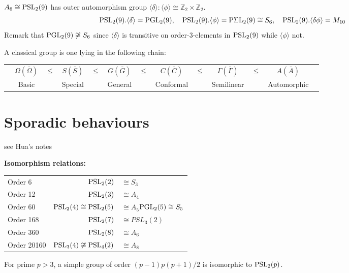 \documentclass[a4paper,11pt]{article}
\def\subtitle#1{\section{#1}}
\begin{document}
\begin{example}
    $A_6\cong \mathrm{PSL}_2(9)$ has outer automorphism group $\langle\delta\rangle:\langle\phi\rangle\cong\mathbb{Z}_2\times\mathbb{Z}_2$.
    \[ \mathrm{PSL}_2(9).\langle\delta\rangle=\mathrm{PGL}_2(9),\quad \mathrm{PSL}_2(9).\langle\phi\rangle=\mathrm{P\Sigma L}_2(9)\cong S_6,\quad \mathrm{PSL}_2(9).\langle\delta\phi\rangle=M_{10} \]
    Remark that $\mathrm{PGL}_2(9)\not\cong S_6$ since $\langle\delta\rangle$ is transitive on order-3-elements in $\mathrm{PSL}_2(9)$ while $\langle\phi\rangle$ not.
\end{example}

\begin{definition} A classical group is one lying in the following chain:
    \begin{table*}[htbp]
        \centering
        \begin{tabular}{ccccccccccccc}
            &$\Omega (\bar{\Omega}) $&$\leq$&$ S (\bar{S}) $&$\leq $&$G (\bar{G})$&$\leq $&$C (\bar{C})$&$\leq $&$\Gamma (\bar{\Gamma})$&$\leq $&$A (\bar{A})$\\
            &Basic & & Special & & General & & Conformal & & Semilinear & & Automorphic 
        \end{tabular}
    \end{table*}
\end{definition}

\subtitle{Sporadic behaviours}

see Hua's notes

\noindent\textbf{Isomorphism relations:}  
\begin{table}[htbp]
    \centering
    \begin{tabular}{lrl}
        Order 6 & $\mathrm{PSL}_2(2)$&$\cong S_3$\\
        Order 12 & $\mathrm{PSL}_2(3)$&$\cong A_4$\\
        Order 60 & $\mathrm{PSL}_2(4)\cong\mathrm{PSL}_2(5)$ &$\cong A_5$\qquad $\mathrm{PGL}_2(5)\cong S_5$\\
        Order 168 & $\mathrm{PSL}_2(7)$ &$\cong PSL_3(2)$\\
        Order 360 & $\mathrm{PSL}_2(8)$ &$\cong A_6$\\
        Order 20160 & $\mathrm{PSL}_3(4)\not\cong\mathrm{PSL}_4(2)$ &$\cong A_{8}$\\
    \end{tabular}
\end{table}

\begin{theorem}
    For prime $p > 3$, a simple group of order $(p - 1)p(p + 1)/2$ is isomorphic to $\mathrm{PSL}_2(p)$.
\end{theorem}
\end{document}
